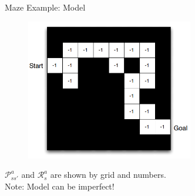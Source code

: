 \documentclass{beamer}
\begin{document}
\begin{frame}{Maze Example: Model}
    \begin{figure}
        \centering
        \includegraphics[width=0.65\textwidth]{images/maze_model}
    \end{figure}
    
    \centering $\mathcal{P}^{a}_{ss'}$ and $\mathcal{R}^{a}_{s}$ are shown by grid and numbers. \\ Note: Model can be imperfect!
\end{frame}
\end{document}
